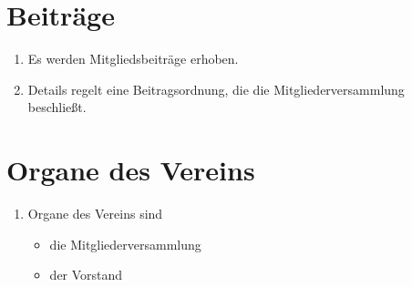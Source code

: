 \documentclass[a4paper,12pt]{scrartcl}
\begin{document}
\section{Beiträge}
\begin{enumerate}
  \item Es werden Mitgliedsbeiträge erhoben.
  \item Details regelt eine Beitragsordnung, die die Mitgliederversammlung
    beschließt.
\end{enumerate}

\section{Organe des Vereins}
\begin{enumerate}
  \item Organe des Vereins sind
  \begin{itemize}
    \item die Mitgliederversammlung
    \item der Vorstand
  \end{itemize}
\end{enumerate}
\end{document}
